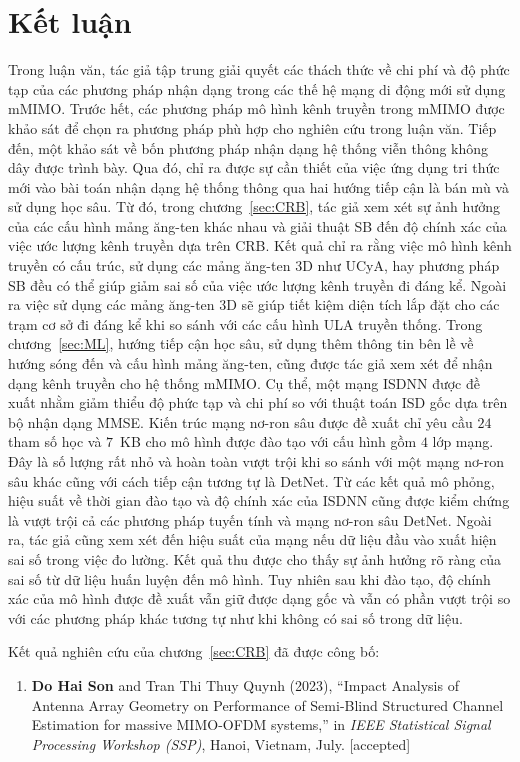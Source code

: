 \clearpage
{}

\chapter*{Kết luận}

Trong luận văn, tác giả tập trung giải quyết các thách thức về chi phí và độ phức tạp của các phương pháp nhận dạng trong các thế hệ mạng di động mới sử dụng mMIMO. Trước hết, các phương pháp mô hình kênh truyền trong mMIMO được khảo sát để chọn ra phương pháp phù hợp cho nghiên cứu trong luận văn. Tiếp đến,
một khảo sát về bốn phương pháp nhận dạng hệ thống viễn thông không dây được trình bày. Qua đó, chỉ ra được sự cần thiết của việc ứng dụng tri thức mới vào bài toán nhận dạng hệ thống thông qua hai hướng tiếp cận là bán mù và sử dụng học sâu. 
Từ đó, trong chương~\ref{sec:CRB}, tác giả xem xét sự ảnh hưởng của các cấu hình mảng ăng-ten khác nhau và giải thuật SB đến độ chính xác của việc ước lượng kênh truyền dựa trên CRB. Kết quả chỉ ra rằng việc mô hình kênh truyền có cấu trúc, sử dụng các mảng ăng-ten 3D như UCyA, hay phương pháp SB đều có thể giúp giảm sai số của việc ước lượng kênh truyền đi đáng kể. Ngoài ra việc sử dụng các mảng ăng-ten 3D sẽ giúp tiết kiệm diện tích lắp đặt cho các trạm cơ sở đi đáng kể khi so sánh với các cấu hình ULA truyền thống.
Trong chương~\ref{sec:ML}, hướng tiếp cận học sâu, sử dụng thêm thông tin bên lề về hướng sóng đến và cấu hình mảng ăng-ten, cũng được tác giả xem xét để nhận dạng kênh truyền cho hệ thống mMIMO. Cụ thể, một mạng ISDNN được đề xuất nhằm giảm thiểu độ phức tạp và chi phí so với thuật toán ISD gốc dựa trên bộ nhận dạng MMSE. Kiến trúc mạng nơ-ron sâu được đề xuất chỉ yêu cầu $24$ tham số học và $7$~KB cho mô hình được đào tạo với cấu hình gồm $4$ lớp mạng. Đây là số lượng rất nhỏ và hoàn toàn vượt trội khi so sánh với một mạng nơ-ron sâu khác cũng với cách tiếp cận tương tự là DetNet. Từ các kết quả mô phỏng, hiệu suất về thời gian đào tạo và độ chính xác của ISDNN cũng được kiểm chứng là vượt trội cả các phương pháp tuyến tính và mạng nơ-ron sâu DetNet.
Ngoài ra, tác giả cũng xem xét đến hiệu suất của mạng nếu dữ liệu đầu vào xuất hiện sai số trong việc đo lường. Kết quả thu được cho thấy sự ảnh hưởng rõ ràng của sai số từ dữ liệu huấn luyện đến mô hình. Tuy nhiên sau khi đào tạo, độ chính xác của mô hình được đề xuất vẫn giữ được dạng gốc và vẫn có phần vượt trội so với các phương pháp khác tương tự như khi không có sai số trong dữ liệu. 

Kết quả nghiên cứu của chương~\ref{sec:CRB} đã được công bố:
\begin{enumerate}
    \item[] \textbf{Do Hai Son} and Tran Thi Thuy Quynh (2023), ``Impact Analysis of Antenna Array Geometry on Performance of Semi-Blind Structured Channel Estimation for massive MIMO-OFDM systems,'' in \textit{IEEE Statistical Signal Processing Workshop (SSP)}, Hanoi, Vietnam, July. [accepted]
\end{enumerate}